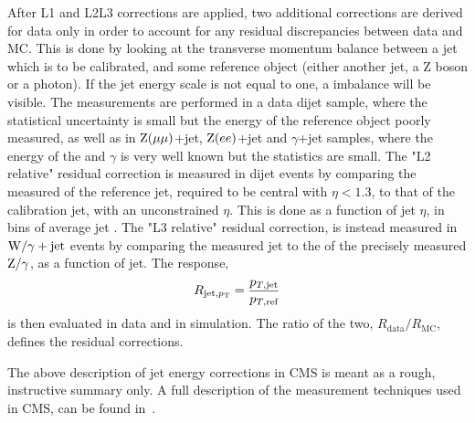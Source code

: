 After L1 and L2L3 corrections are applied, two additional corrections are derived for data only in order to account for any residual discrepancies between data and MC. This is done by looking at the transverse momentum balance between a jet which is to be calibrated, and some reference object (either another jet, a Z boson or a photon). If the jet energy scale is not equal to one, a \PT imbalance will be visible. The measurements are performed in a data dijet sample, where the statistical uncertainty is small but the energy of the reference object poorly measured, as well as in $\mathrm{Z}(\mu\mu)$+jet, $\mathrm{Z}(ee)$+jet and $\gamma$+jet samples, where the energy of the \PZ and $\gamma$ is very well known but the statistics are small. \newline
The  "L2 relative" residual correction is measured in dijet events by comparing the measured \PT of the reference jet, required to be central with $\eta<1.3$, to that of the calibration jet, with an unconstrained $\eta$. This is done as a function of jet $\eta$, in bins of average jet \PT.
The "L3 relative" residual correction, is instead measured in $\mathrm{W}/\gamma+\textrm{jet}$ events by comparing the measured jet \PT to the \PT of the precisely measured $\mathrm{Z}/\gamma$, as a function of jet\PT.
The response, 
\begin{equation*}
R_{\textrm{jet,\ensuremath{p_{\mathrm{T}}}}}=\frac{p_{T,\textrm{jet}}}{p_{T,\textrm{ref}}}
\end{equation*}
is then evaluated in data and in simulation. The ratio of the two, $R_{\textrm{data}}/R_{\textrm{MC}}$, defines the residual corrections.\newline\newline

The above description of jet energy corrections in CMS is meant as a rough, instructive summary only. A full description of the measurement techniques used in CMS, can be found in~\cite{jme_jinst}. 

